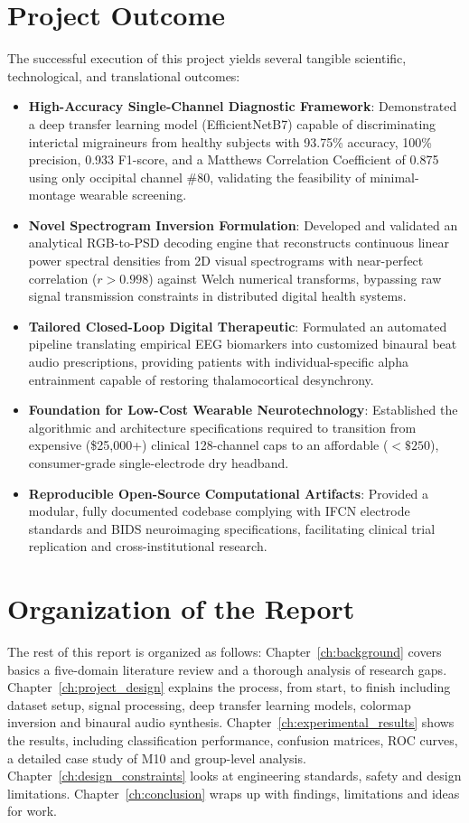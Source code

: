 \documentclass[12pt, a4paper]{report}
\begin{document}
\section{Project Outcome}
\label{sec:project_outcome}
The successful execution of this project yields several tangible scientific, technological, and translational outcomes:
\begin{itemize}
    \item \textbf{High-Accuracy Single-Channel Diagnostic Framework}: Demonstrated a deep transfer learning model (EfficientNetB7) capable of discriminating interictal migraineurs from healthy subjects with 93.75\% accuracy, 100\% precision, 0.933 F1-score, and a Matthews Correlation Coefficient of 0.875 using only occipital channel \#80, validating the feasibility of minimal-montage wearable screening.
    \item \textbf{Novel Spectrogram Inversion Formulation}: Developed and validated an analytical RGB-to-PSD decoding engine that reconstructs continuous linear power spectral densities from 2D visual spectrograms with near-perfect correlation ($r > 0.998$) against Welch numerical transforms, bypassing raw signal transmission constraints in distributed digital health systems.
    \item \textbf{Tailored Closed-Loop Digital Therapeutic}: Formulated an automated pipeline translating empirical EEG biomarkers into customized binaural beat audio prescriptions, providing patients with individual-specific alpha entrainment capable of restoring thalamocortical desynchrony.
    \item \textbf{Foundation for Low-Cost Wearable Neurotechnology}: Established the algorithmic and architecture specifications required to transition from expensive (\$25,000+) clinical 128-channel caps to an affordable ($<\$250$), consumer-grade single-electrode dry headband.
    \item \textbf{Reproducible Open-Source Computational Artifacts}: Provided a modular, fully documented codebase complying with IFCN electrode standards and BIDS neuroimaging specifications, facilitating clinical trial replication and cross-institutional research.
\end{itemize}

\section{Organization of the Report}
\label{sec:organization}
The rest of this report is organized as follows: Chapter~\ref{ch:background} covers basics a five-domain literature review and a thorough analysis of research gaps. Chapter~\ref{ch:project_design} explains the process, from start, to finish including dataset setup, signal processing, deep transfer learning models, colormap inversion and binaural audio synthesis. Chapter~\ref{ch:experimental_results} shows the results, including classification performance, confusion matrices, ROC curves, a detailed case study of M10 and group-level analysis. Chapter~\ref{ch:design_constraints} looks at engineering standards, safety and design limitations. Chapter~\ref{ch:conclusion} wraps up with findings, limitations and ideas for work.
\end{document}
